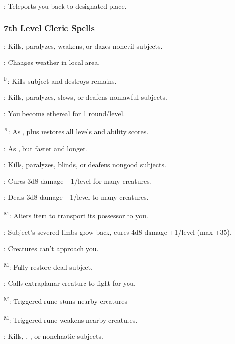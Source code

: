 : Teleports you back to designated place.

\subsubsection{7th Level Cleric Spells}

: Kills, paralyzes, weakens, or dazes nonevil subjects.

: Changes weather in local area.

\textsuperscript{F}: Kills subject and destroys remains.

: Kills, paralyzes, slows, or deafens nonlawful subjects.

: You become ethereal for 1 round/level.

\textsuperscript{X}: As , plus restores all levels and ability scores.

: As , but faster and longer.

: Kills, paralyzes, blinds, or deafens nongood subjects.

: Cures 3d8 damage +1/level for many creatures.

: Deals 3d8 damage +1/level to many creatures.

\textsuperscript{M}: Alters item to transport its possessor to you.

: Subject's severed limbs grow back, cures 4d8 damage +1/level (max +35).

: Creatures can't approach you.

\textsuperscript{M}: Fully restore dead subject.

: Calls extraplanar creature to fight for you.

\textsuperscript{M}: Triggered rune stuns nearby creatures.

\textsuperscript{M}: Triggered rune weakens nearby creatures.

: Kills, , , or  nonchaotic subjects.

